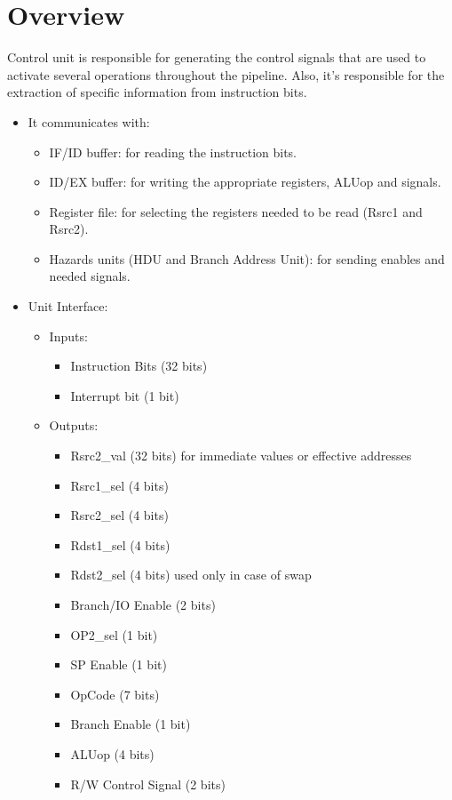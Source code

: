 \section{Overview}
Control unit is responsible for generating the control signals that are used to activate several operations throughout the pipeline. Also, it's responsible for the extraction of specific information from instruction bits.

\begin{itemize}
    \item It communicates with:
    \begin{itemize}
        \item IF/ID buffer: for reading the instruction bits.
        \item ID/EX buffer: for writing the appropriate registers, ALUop and signals.
        \item Register file: for selecting the registers needed to be read (Rsrc1 and Rsrc2).
        \item Hazards units (HDU and Branch Address Unit): for sending enables and needed signals.
    \end{itemize}
    
    \item Unit Interface:
    \begin{itemize}
    
        \item Inputs: 
        \begin{itemize}
            \item Instruction Bits (32 bits)
            \item Interrupt bit (1 bit)
        \end{itemize}
        
        \item Outputs:
        \begin{itemize}
            \item Rsrc2\_val (32 bits) for immediate values or effective addresses
            \item Rsrc1\_sel (4 bits)
            \item Rsrc2\_sel (4 bits)
            \item Rdst1\_sel (4 bits)
            \item Rdst2\_sel (4 bits) used only in case of swap
            \item Branch/IO Enable (2 bits)
            \item OP2\_sel (1 bit)
            \item SP Enable (1 bit)
            \item OpCode (7 bits)
            \item Branch Enable (1 bit)
            \item ALUop (4 bits)
            \item R/W Control Signal (2 bits)
        \end{itemize}
        

\end{itemize}
\end{itemize}
